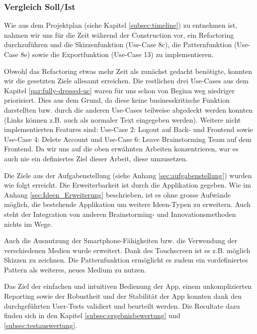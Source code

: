 \subsubsection{Vergleich Soll/Ist}
Wie aus dem Projektplan (siehe Kapitel \ref{subsec:timeline}) zu entnehmen ist, nahmen wir uns für die Zeit während der Construction vor, ein Refactoring durchzuführen und die Skizzenfunktion (Use-Case 8c), die Patternfunktion (Use-Case 8e) sowie die Exportfunktion (Use-Case 13) zu implementieren. 

Obwohl das Refactoring etwas mehr Zeit als zunächst gedacht benötigte, konnten wir die gesetzten Ziele allesamt erreichen. Die restlichen drei Use-Cases aus dem Kapitel \ref{par:fully-dressed-uc} waren für uns schon von Beginn weg niedriger priorisiert. Dies aus dem Grund, da diese keine businesskritische Funktion darstellten bzw. durch die anderen Use-Cases teilweise abgedeckt werden konnten (Links können z.B. auch als normaler Text eingegeben werden). Weitere nicht implementierten Features sind: Use-Case 2: Logout auf Back- und Frontend sowie Use-Case 4: Delete Account und Use-Case 6: Leave Brainstorming Team auf dem Frontend. Da wir uns auf die oben erwähnten Arbeiten konzentrieren, war es auch nie ein definiertes Ziel dieser Arbeit, diese umzusetzen. 

Die Ziele aus der Aufgabenstellung (siehe Anhang \ref{sec:aufgabenstellung}) wurden wie folgt erreicht. Die Erweiterbarkeit ist durch die Applikation gegeben. Wie im Anhang \ref{sec:Ideen_Erweiterung} beschrieben, ist es ohne grosse Aufwände möglich, die bestehende Applikation um weitere Ideen-Typen zu erweitern. Auch steht der Integration von anderen Brainstorming- und Innovationsmethoden nichts im Wege.

Auch die Ausnutzung der Smartphone-Fähigkeiten bzw. die Verwendung der verschiedenen Medien wurde erweitert. Dank des Touchscreen ist es z.B. möglich Skizzen zu zeichnen. Die Patternfunktion ermöglicht es zudem ein vordefiniertes Pattern als weiteres, neues Medium zu nutzen.

Das Ziel der einfachen und intuitiven Bedienung der App, einem unkomplizierten Reporting sowie der Robustheit und der Stabilität der App konnten dank den durchgeführten User-Tests validiert und beurteilt werden. Die Resultate dazu finden sich in den Kapitel \ref{subsec:ergebnisbewertung} und \ref{subsec:testauswertung}.
